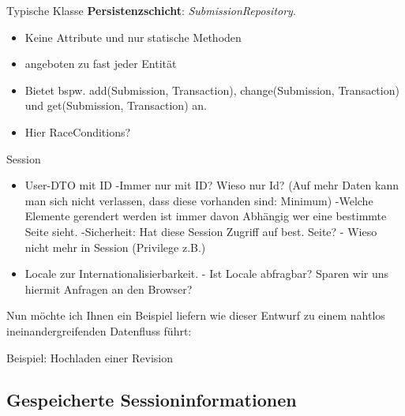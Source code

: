 \documentclass{beamer}
\begin{document}
    \begin{frame}{Typische Klasse \textbf{Persistenzschicht}:}
        \emph{SubmissionRepository}.
        \pause
        \begin{itemize}
            \item Keine Attribute und nur statische Methoden
            \item angeboten zu fast jeder Entität
            \item Bietet bspw. add(Submission, Transaction), change(Submission, Transaction)
            und get(Submission, Transaction) an.
            \item Hier RaceConditions?
        \end{itemize}

        \begin{frame}{Session}
            \begin{itemize}
                \item User-DTO mit ID
                -Immer nur mit ID? Wieso nur Id? (Auf mehr Daten kann man sich nicht verlassen, dass diese vorhanden sind: Minimum)
                -Welche Elemente gerendert werden ist immer davon Abhängig wer eine bestimmte Seite sieht.
                -Sicherheit: Hat diese Session Zugriff auf best. Seite?
                - Wieso nicht mehr in Session (Privilege z.B.)
                \pause
                \item Locale zur Internationalisierbarkeit.
                - Ist Locale abfragbar? Sparen wir uns hiermit Anfragen an den Browser?
            \end{itemize}

            Nun möchte ich Ihnen ein Beispiel liefern wie dieser Entwurf zu einem nahtlos ineinandergreifenden
            Datenfluss führt:
            \begin{frame}{Beispiel: Hochladen einer Revision}
            \end{frame}
        \end{frame}

        \subsection{Gespeicherte Sessioninformationen}



\end{frame}
\end{document}

